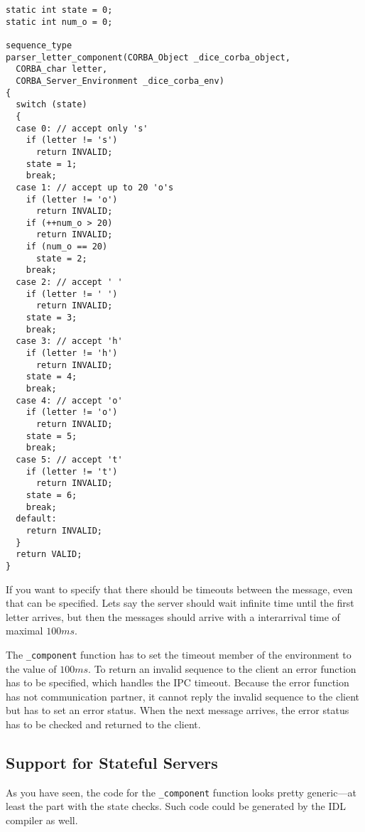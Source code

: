 \begin{verbatim}
static int state = 0;
static int num_o = 0;

sequence_type
parser_letter_component(CORBA_Object _dice_corba_object,
  CORBA_char letter,
  CORBA_Server_Environment _dice_corba_env)
{
  switch (state)
  {
  case 0: // accept only 's'
    if (letter != 's')
      return INVALID;
    state = 1;
    break;
  case 1: // accept up to 20 'o's
    if (letter != 'o')
      return INVALID;
    if (++num_o > 20)
      return INVALID;
    if (num_o == 20)
      state = 2;
    break;
  case 2: // accept ' '
    if (letter != ' ')
      return INVALID;
    state = 3;
    break;
  case 3: // accept 'h'
    if (letter != 'h')
      return INVALID;
    state = 4;
    break;
  case 4: // accept 'o'
    if (letter != 'o')
      return INVALID;
    state = 5;
    break;
  case 5: // accept 't'
    if (letter != 't')
      return INVALID;
    state = 6;
    break;
  default:
    return INVALID;
  }
  return VALID;
}
\end{verbatim}

If you want to specify that there should be timeouts between the message, even
that can be specified.  Lets say the server should wait infinite time until the
first letter arrives, but then the messages should arrive with a interarrival
time of maximal $100ms$.

The \verb|_component| function has to set the timeout member of the environment
to the value of $100ms$.  To return an invalid sequence to the client an error
function has to be specified, which handles the IPC timeout.  Because the error
function has not communication partner, it cannot reply the invalid sequence to
the client but has to set an error status.  When the next message arrives, the 
error status has to be checked and returned to the client.

\subsection{Support for Stateful Servers}
As you have seen, the code for the \verb|_component| function looks pretty 
generic---at least the part with the state checks.  Such code could be generated
by the IDL compiler as well.

